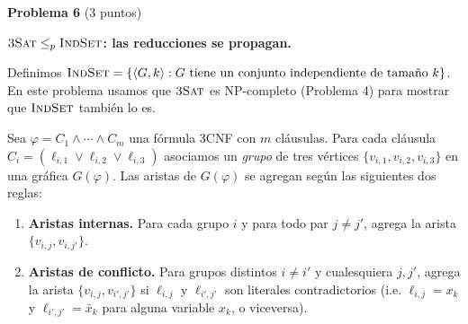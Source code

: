 \documentclass[12pt, letterpaper]{article}
\newcommand{\tSAT}{\textsc{3Sat}}
\newcommand{\problema}[2]{%
  \bigskip
  \noindent\textbf{Problema #1} \textnormal{(#2 puntos)}\par\smallskip
}
\begin{document}
\problema{6}{3} \textbf{$\tSAT \leq_p \textsc{IndSet}$: las reducciones
se propagan.}

Definimos
$\textsc{IndSet} = \{\langle G, k\rangle :\text{$G$ tiene un conjunto
independiente de tamaño $k$}\}$.
En este problema usamos que $\tSAT$ es NP-completo (Problema 4) para mostrar
que $\textsc{IndSet}$ también lo es.

Sea $\varphi = C_1 \wedge \cdots \wedge C_m$ una fórmula 3CNF con $m$
cláusulas.  Para cada cláusula $C_i = (\ell_{i,1} \vee \ell_{i,2} \vee
\ell_{i,3})$ asociamos un \emph{grupo} de tres vértices
$\{v_{i,1}, v_{i,2}, v_{i,3}\}$ en una gráfica $G(\varphi)$.  Las aristas
de $G(\varphi)$ se agregan según las siguientes dos reglas:
\begin{enumerate}[label=(R\arabic*)]
  \item \textbf{Aristas internas.}  Para cada grupo $i$ y para todo par
    $j \neq j'$, agrega la arista $\{v_{i,j}, v_{i,j'}\}$.
  \item \textbf{Aristas de conflicto.}  Para grupos distintos $i \neq i'$
    y cualesquiera $j, j'$, agrega la arista $\{v_{i,j}, v_{i',j'}\}$ si
    $\ell_{i,j}$ y $\ell_{i',j'}$ son literales contradictorios (i.e.
    $\ell_{i,j} = x_k$ y $\ell_{i',j'} = \bar{x}_k$ para alguna variable
    $x_k$, o viceversa).
\end{enumerate}
\end{document}
